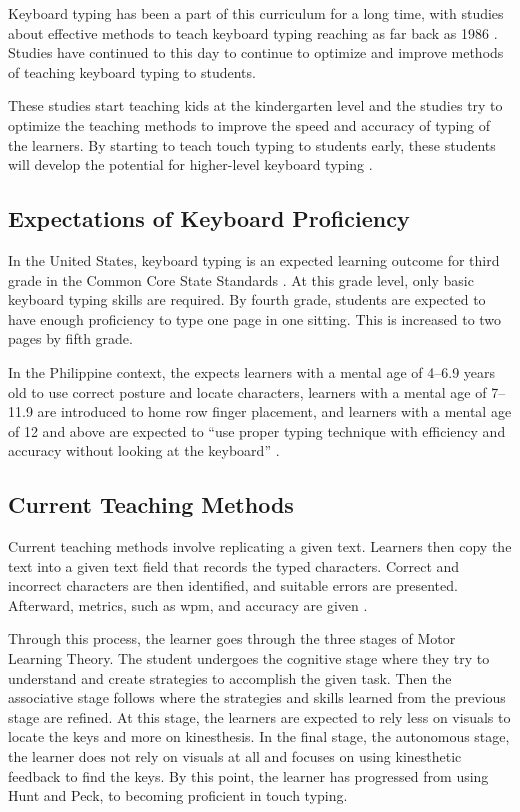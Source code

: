 \documentclass{report}
\begin{document}
Keyboard typing has been a part of this curriculum for a long time, with studies
about effective methods to teach keyboard typing reaching as far back as 1986
\parencite{hoot1986}. Studies have continued to this day to continue to optimize
and improve methods of teaching keyboard typing to students.

These studies start teaching kids at the kindergarten level and the studies try
to optimize the teaching methods to improve the speed and accuracy of typing of
the learners. By starting to teach touch typing to students early, these
students will develop the potential for higher-level keyboard typing
\parencite{donica2018}.

\subsection{Expectations of Keyboard Proficiency}

In the United States, keyboard typing is an expected learning outcome for third
grade in the Common Core State Standards \parencite{ccs}. At this grade level,
only basic keyboard typing skills are required. By fourth grade, students are
expected to have enough proficiency to type one page in one sitting. This is
increased to two pages by fifth grade.

In the Philippine context, the \citeauthor{deped} expects learners with a mental
age of 4--6.9 years old to use correct posture and locate characters, learners
with a mental age of 7--11.9 are introduced to home row finger placement, and
learners with a mental age of 12 and above are expected to ``use proper typing
technique with efficiency and accuracy without looking at the keyboard''
\parencite{deped}.

\subsection{Current Teaching Methods}

Current teaching methods involve replicating a given text. Learners then copy
the text into a given text field that records the typed characters. Correct and
incorrect characters are then identified, and suitable errors are presented.
Afterward, metrics, such as \ac{wpm}, and accuracy are given
\parencite{bartnik2021, typeracer}.

Through this process, the learner goes through the three stages of Motor
Learning Theory. The student undergoes the cognitive stage where they try to
understand and create strategies to accomplish the given task. Then the
associative stage follows where the strategies and skills learned from the
previous stage are refined. At this stage, the learners are expected to rely less
on visuals to locate the keys and more on kinesthesis. In the final stage, the
autonomous stage, the learner does not rely on visuals at all and focuses on
using kinesthetic feedback to find the keys. By this point, the learner has
progressed from using Hunt and Peck, to becoming proficient in touch typing.
\parencite{donica2018}
\end{document}
